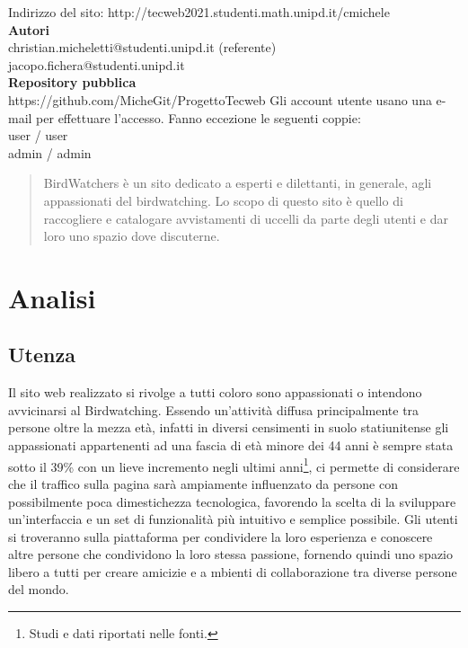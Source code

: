 \documentclass[12pt, a4paper]{article}
\begin{document}
    \begin{titlepage}
        \begin{center}
            Indirizzo del sito: http://tecweb2021.studenti.math.unipd.it/cmichele \\
            \textbf{Autori} \\
            christian.micheletti@studenti.unipd.it (referente) \\
            jacopo.fichera@studenti.unipd.it \\
            \textbf{Repository pubblica} \\
            https://github.com/MicheGit/ProgettoTecweb
            \vfill
            Gli account utente usano una e-mail per effettuare l'accesso. Fanno eccezione le seguenti coppie: \\
            user / user \\
            admin / admin
        \end{center}
    \end{titlepage}

    \newpage

    \tableofcontents

    \newpage

    \begin{abstract}
        BirdWatchers è un sito dedicato a esperti e dilettanti, in generale, agli appassionati del birdwatching. Lo scopo di questo sito è quello di raccogliere e catalogare avvistamenti di uccelli da parte degli utenti e dar loro uno spazio dove discuterne.
    \end{abstract}

    \newpage


    \section{Analisi}

    \subsection{Utenza}
    Il sito web realizzato si rivolge a tutti coloro sono appassionati o intendono avvicinarsi al Birdwatching.
    Essendo un'attività diffusa principalmente tra persone oltre la mezza età, infatti in diversi censimenti
    in suolo statiunitense gli appassionati appartenenti ad una fascia di età minore dei 44 anni è sempre stata sotto il 39\%
    con un lieve incremento negli ultimi anni\footnote{Studi e dati riportati nelle fonti.},
    ci permette di  considerare che il traffico sulla pagina sarà ampiamente
    influenzato da persone con possibilmente poca dimestichezza tecnologica, favorendo la scelta di la sviluppare
    un'interfaccia e un set di funzionalità più intuitivo e semplice possibile.
    Gli utenti si troveranno sulla piattaforma per condividere la loro esperienza e conoscere altre persone che
    condividono la loro stessa passione, fornendo quindi uno spazio libero a tutti per creare amicizie e a
    mbienti di collaborazione tra diverse persone del mondo.
\end{document}
